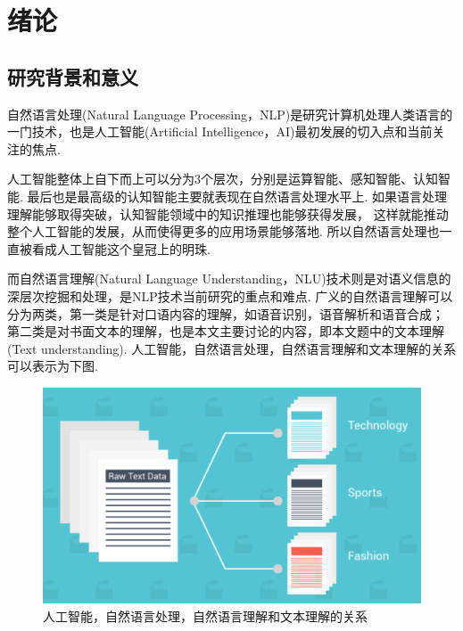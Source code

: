 \documentclass[bachelor,adobefonts]{jnuthesis}
\begin{document}
\tableofcontents

\mainmatter


\chapter{绪论}\label{chapter_introduction}
\section{研究背景和意义}
自然语言处理(Natural Language Processing，NLP)是研究计算机处理人类语言的一门技术，也是人工智能(Artificial Intelligence，AI)最初发展的切入点和当前关注的焦点.

人工智能整体上自下而上可以分为3个层次，分别是运算智能、感知智能、认知智能.
最后也是最高级的认知智能主要就表现在自然语言处理水平上.
如果语言处理理解能够取得突破，认知智能领域中的知识推理也能够获得发展，
这样就能推动整个人工智能的发展，从而使得更多的应用场景能够落地.
所以自然语言处理也一直被看成人工智能这个皇冠上的明珠.

而自然语言理解(Natural Language Understanding，NLU)技术则是对语义信息的深层次挖掘和处理，是NLP技术当前研究的重点和难点.
广义的自然语言理解可以分为两类，第一类是针对口语内容的理解，如语音识别，语音解析和语音合成；
第二类是对书面文本的理解，也是本文主要讨论的内容，即本文题中的文本理解(Text understanding).
人工智能，自然语言处理，自然语言理解和文本理解的关系可以表示为下图.

\begin{figure}[h!]
  \centering
    \includegraphics[width=\linewidth]{wenbenfenlei.png}
  \caption{人工智能，自然语言处理，自然语言理解和文本理解的关系}
\end{figure}
\end{document}
